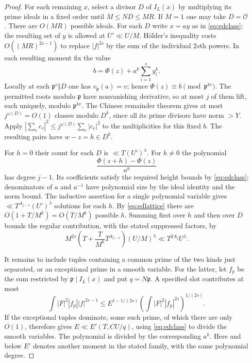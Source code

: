 \documentclass[11pt,letterpaper]{article}
\theoremstyle{definition}
\numberwithin{equation}{section}
\begin{document}
\begin{proof}
For each remaining $x$, select a divisor $D$ of $I_L(x)$ by multiplying
its prime ideals in a fixed order until $M\le ND\le MR$. If $M=1$
one may take $D=\mathcal O$. There are $O(MR)$ possible ideals. For
each $D$ write $x=a y$ as in \eqref{eq:edclass}; the resulting set of
$y$ is allowed at $U'\ll U/M$. H\"older's inequality costs
$O((MR)^{2s-1})$ to replace $|f|^{2s}$ by the sum of the individual
$2s$th powers. In each resulting moment fix the value
\[
 b=\Phi(z)+a^k\sum_{i=1}^s y_i^k .
\]
Locally at each $\mathfrak p^v\Vert D$ one has $v_{\mathfrak p}(a)=v$;
hence $\Phi(z)\equiv b\pmod{\mathfrak p^{kv}}$. The permitted roots
modulo $\mathfrak p$ have nonvanishing derivative, so at most $j$ of
them lift, each uniquely, modulo $\mathfrak p^{kv}$. The Chinese
remainder theorem gives at most $j^{\omega(D)}=O(1)$ classes modulo
$D^k$, since all its prime divisors have norm $>Y$. Apply
$|\sum_r c_r|^2\le j^{\omega(D)}\sum_r |c_r|^2$ to the multiplicities
for this fixed $b$. The resulting pairs have $w-z=h\in D^k$.

For $h=0$ their count for each $D$ is $\ll T(U')^\lambda$. For $h\ne0$
the polynomial
\[
               \frac{\Phi(z+h)-\Phi(z)}{a^k}
\]
has degree $j-1$. Its coefficients satisfy the required height bounds by
\eqref{eq:edclass}; denominators of $a$ and $a^{-1}$ have polynomial
size by the ideal identity and the norm bound. The inductive assertion
for a single polynomial variable gives $\ll T^{A_{j-1}}(U')^\lambda$
solutions for each $h$. By \eqref{eq:edlattice} there are
$O(1+T/M^k)=O(T/M^k)$ possible $h$. Summing first over $h$ and then
over $D$ bounds the regular contribution, with the stated suppressed
factors, by
\[
 M^{2s}\left(T+\frac{T}{M^k}T^{A_{j-1}}\right)
                 (U/M)^\lambda
          \ll T^{2A_j}U^\lambda .
\]

It remains to include tuples containing a common prime of the two kinds
just separated, or an exceptional prime in a smooth variable.
For the latter, let $f_p$ be the sum restricted by
$\mathfrak p\mid I_L(x)$ and put $q=N\mathfrak p$. A specified slot
contributes at most
\[
  \int |F|^2 |f_p| |f|^{2s-1}
  \le E^{1-1/(2s)}
       \left(\int |F|^2 |f_p|^{2s}\right)^{1/(2s)} .
\]
If the exceptional tuples dominate, some such prime, of which there
are only $O(1)$, therefore gives
$E\ll E'(T,CU/q)$, using \eqref{eq:edclass} to divide the smooth
variables. The polynomial is divided by the corresponding $a^k$.
Here and below $E'$ denotes another moment in the stated family, with
the same polynomial degree.


\end{proof}
\end{document}
